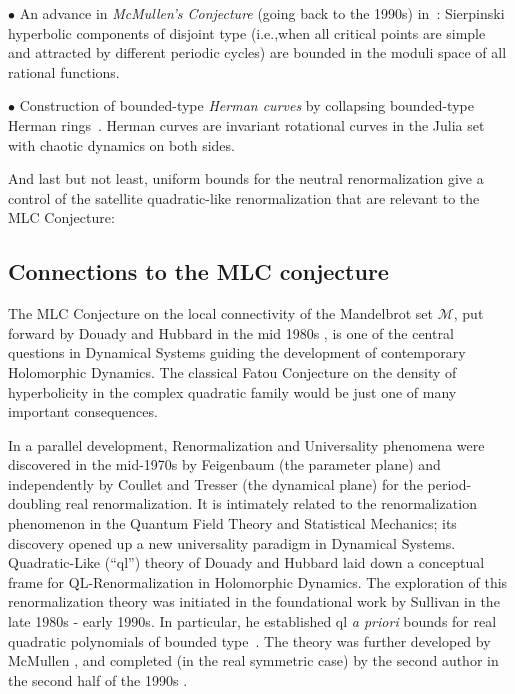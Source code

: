 \documentclass{amsart}
\newcommand{\1}{{\mathbb 1 }}
\newcommand{\Mandel}{{\mathcal{M}}}
\theoremstyle{remark}
\numberwithin{equation}{section}
\theoremstyle{definition}
\begin{document}
\noindent $\bullet$
 An advance in {\em McMullen's Conjecture} (going back to the 1990s) in~\cite{DL:HypComp}: Sierpinski hyperbolic components of disjoint type (i.e.,when  all critical points are simple and attracted by different periodic cycles) are bounded in the moduli space of all rational functions. 
 

\noindent $\bullet$
  Construction of bounded-type {\em Herman curves} by collapsing bounded-type Herman rings~\cite{Lim}. Herman curves are invariant rotational curves in the Julia set with chaotic dynamics on both sides. 




And last but not least, uniform  bounds for the neutral renormalization give a control of the
satellite quadratic-like renormalization that are relevant to the
MLC Conjecture:


\subsection{Connections to the MLC conjecture}\label{ss:MLC}
 The MLC Conjecture on the local connectivity of the Mandelbrot set
$\Mandel$, put forward by Douady and Hubbard in the mid 1980s \cite{DH:Orsay}, is one of the central questions in Dynamical Systems guiding the development of contemporary Holomorphic Dynamics.  The classical Fatou Conjecture on the density of hyperbolicity in the complex quadratic family would be just one of many important consequences.

In a parallel development, Renormalization and
Universality  phenomena were discovered in the mid-1970s by Feigenbaum (the parameter plane) and independently by Coullet and Tresser (the dynamical plane) for the period-doubling real renormalization. It is intimately related to the renormalization phenomenon in the Quantum Field Theory and Statistical Mechanics; its discovery opened up a new universality paradigm in Dynamical Systems.  Quadratic-Like (``ql'')  theory of Douady and Hubbard \cite{DH:ql} laid down a conceptual frame for QL-Renormalization in Holomorphic Dynamics.  The exploration of this renormalization theory was initiated in the foundational work by Sullivan in the late 1980s - early 1990s. In particular, he established ql \emph{a priori} bounds for real quadratic polynomials of bounded type~\cite{S:Berkeley,S}. The theory was further developed by McMullen \cite{McM2,McM3}, and completed (in the real symmetric case) by the second author in the second half of the 1990s \cite{L-feigen}.
\end{document}
